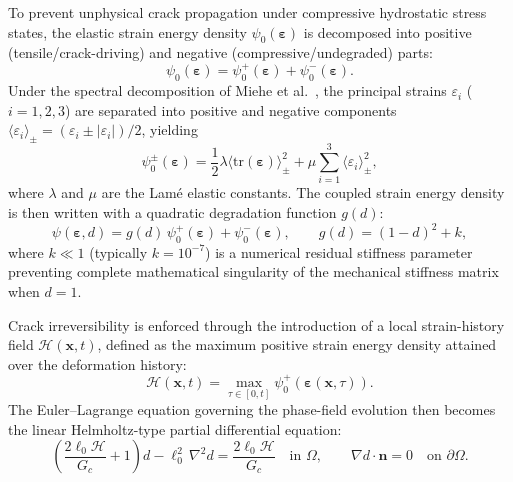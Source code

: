 To prevent unphysical crack propagation under compressive hydrostatic stress states, the elastic strain energy density $\psi_0(\boldsymbol\varepsilon)$ is decomposed into positive (tensile/crack-driving) and negative (compressive/undegraded) parts:
\begin{equation}
\label{eq:strain_energy_split}
\psi_0(\boldsymbol\varepsilon) = \psi_0^+(\boldsymbol\varepsilon) + \psi_0^-(\boldsymbol\varepsilon).
\end{equation}
Under the spectral decomposition of Miehe et al.\ \citep{Msekh2015,Molnar2017}, the principal strains $\varepsilon_i$ ($i=1,2,3$) are separated into positive and negative components $\langle \varepsilon_i \rangle_\pm = (\varepsilon_i \pm \lvert\varepsilon_i\rvert)/2$, yielding
\begin{equation}
\psi_0^\pm(\boldsymbol\varepsilon) = \frac{1}{2}\lambda \langle \mathrm{tr}(\boldsymbol\varepsilon) \rangle_\pm^2 + \mu \sum_{i=1}^3 \langle \varepsilon_i \rangle_\pm^2,
\end{equation}
where $\lambda$ and $\mu$ are the Lam\'e elastic constants. The coupled strain energy density is then written with a quadratic degradation function $g(d)$:
\begin{equation}
\psi(\boldsymbol\varepsilon, d) = g(d)\,\psi_0^+(\boldsymbol\varepsilon) + \psi_0^-(\boldsymbol\varepsilon), \qquad g(d) = (1 - d)^2 + k,
\end{equation}
where $k \ll 1$ (typically $k = 10^{-7}$) is a numerical residual stiffness parameter preventing complete mathematical singularity of the mechanical stiffness matrix when $d = 1$.

Crack irreversibility is enforced through the introduction of a local strain-history field $\mathcal{H}(\mathbf{x}, t)$, defined as the maximum positive strain energy density attained over the deformation history:
\begin{equation}
\label{eq:history_variable}
\mathcal{H}(\mathbf{x}, t) = \max_{\tau \in [0, t]} \psi_0^+(\boldsymbol\varepsilon(\mathbf{x}, \tau)).
\end{equation}
The Euler--Lagrange equation governing the phase-field evolution then becomes the linear Helmholtz-type partial differential equation:
\begin{equation}
\label{eq:pde_phase}
\left( \frac{2\ell_0 \mathcal{H}}{G_c} + 1 \right) d - \ell_0^2\,\nabla^2 d = \frac{2\ell_0 \mathcal{H}}{G_c} \quad \text{in } \Omega, \qquad \nabla d \cdot \mathbf{n} = 0 \quad \text{on } \partial\Omega.
\end{equation}

